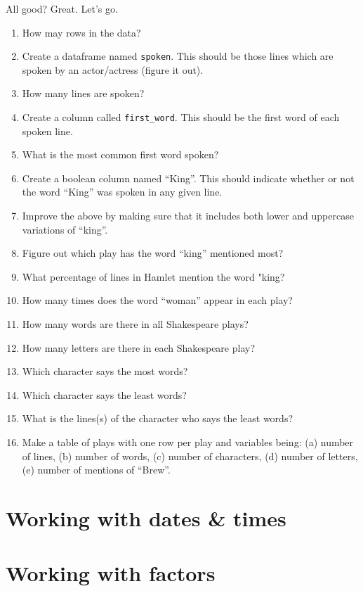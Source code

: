 \documentclass[
]{book}
\begin{document}
All good? Great. Let's go.

\begin{enumerate}
\def\labelenumi{\arabic{enumi}.}
\item
  How may rows in the data?
\item
  Create a dataframe named \texttt{spoken}. This should be those lines which are spoken by an actor/actress (figure it out).
\item
  How many lines are spoken?
\item
  Create a column called \texttt{first\_word}. This should be the first word of each spoken line.
\item
  What is the most common first word spoken?
\item
  Create a boolean column named ``King''. This should indicate whether or not the word ``King'' was spoken in any given line.
\item
  Improve the above by making sure that it includes both lower and uppercase variations of ``king''.
\item
  Figure out which play has the word ``king'' mentioned most?
\item
  What percentage of lines in Hamlet mention the word "king?
\item
  How many times does the word ``woman'' appear in each play?
\item
  How many words are there in all Shakespeare plays?
\item
  How many letters are there in each Shakespeare play?
\item
  Which character says the most words?
\item
  Which character says the least words?
\item
  What is the lines(s) of the character who says the least words?
\item
  Make a table of plays with one row per play and variables being: (a) number of lines, (b) number of words, (c) number of characters, (d) number of letters, (e) number of mentions of ``Brew''.
\end{enumerate}

\hypertarget{working-with-dates-times}{%
\chapter{Working with dates \& times}\label{working-with-dates-times}}

\hypertarget{working-with-factors}{%
\chapter{Working with factors}\label{working-with-factors}}
\end{document}
